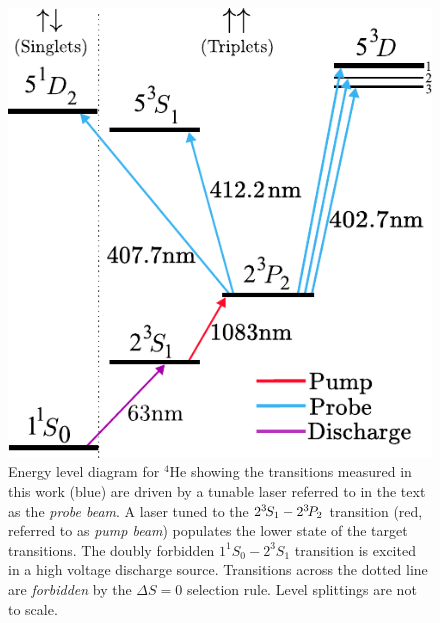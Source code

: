   \begin{figure}
  	
  	\begin{minipage}[t]{0.38\textwidth}
			\vspace{0pt}
      \caption{Energy level diagram for $^4$He showing the transitions measured in this work (blue) are driven by a tunable laser referred to in the text as the \emph{probe beam}.
				A laser tuned to the $2^{3\!} S_1-2^{3\!} P_2$ transition (red, referred to as \emph{pump beam}) populates the lower state of the target transitions.
				 The doubly forbidden $1^{1\!}S_0 - 2^{3\!}S_1$ transition is excited in a high voltage discharge source.
				Transitions across the dotted line are \emph{forbidden} by the $\Delta S=0$ selection rule.
				Level splittings are not to scale.}
      \label{fig:lvl_diag}
      \end{minipage}
      \hfill
      \begin{minipage}[t]{0.6\textwidth}
      \vspace{0pt}
      \includegraphics[width=\textwidth]{fig/spectroscopy/level-diagram-tight-latex-pdf.pdf}
      \end{minipage}
  \end{figure}

